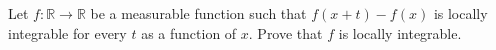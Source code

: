 Let $f: \mathbb{R} \to \mathbb{R}$ be a measurable function such that $f(x+t) - f(x)$ is locally integrable for every $t$ as a function of $x$. Prove that $f$ is locally integrable.